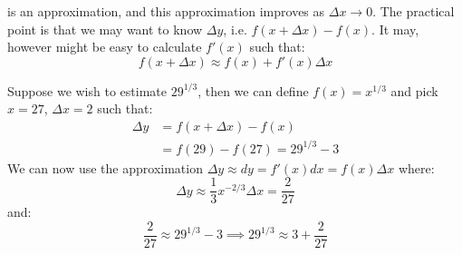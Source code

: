 \begin{itemize}
\begin{idea}
\begin{equation}
        \label{eq:}
    \end{equation}
    is an approximation, and this approximation improves as $\Delta x \to 0$. The practical point is that we may want to know $\Delta y$, i.e. $f(x+\Delta x)-f(x)$. It may, however might be easy to calculate $f'(x)$ such that:
    \begin{equation}
        f(x+\Delta x) \approx f(x)+f'(x)\Delta x
        \label{eq:}
    \end{equation}
\end{idea}
\begin{example}
    Suppose we wish to estimate $29^{1/3}$, then we can define $f(x)=x^{1/3}$ and pick $x=27$, $\Delta x=2$ such that:
    \begin{align}
        \Delta y &= f(x+\Delta x)-f(x) \\ 
        &= f(29)-f(27)=29^{1/3}-3 
        \label{eq:}
    \end{align}
    We can now use the approximation $\Delta y \approx dy = f'(x)dx = f(x)\Delta x$ where:
    \begin{equation}
        \Delta y \approx \frac{1}{3}x^{-2/3}\Delta x = \frac{2}{27}
        \label{eq:}
    \end{equation}
    and:
    \begin{equation}
        \frac{2}{27} \approx 29^{1/3}-3 \implies 29^{1/3} \approx 3+\frac{2}{27}
        \label{eq:}
    \end{equation}    
\end{example}
\end{itemize}
